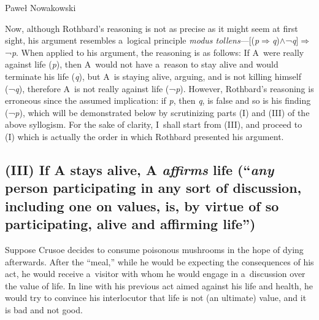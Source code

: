 \begin{artengenv}{Paweł Nowakowski}
\begin{enumerate}[label=(\Roman*), start=4]
\end{enumerate}

Now, although Rothbard's reasoning is not as precise as it might seem at first sight, his argument resembles a~logical principle \textit{modus tollens}---[(\textit{p}$\Rightarrow $\textit{q})${\wedge}$¬\textit{q}]$\Rightarrow $¬\textit{p}. When applied to his argument, the reasoning is as follows: If A~were really against life (\textit{p}), then A~would not have a~reason to stay alive and would terminate his life (\textit{q}), but A~is staying alive, arguing, and is not killing himself (¬\textit{q}), therefore A~is not really against life (¬\textit{p}). However, Rothbard's reasoning is erroneous since the assumed implication: if \textit{p}, then \textit{q}, is false and so is his finding (¬\textit{p}), which will be demonstrated below by scrutinizing parts (I) and (III) of the above syllogism. For the sake of clarity, I~shall start from (III), and proceed to (I) which is actually the order in which Rothbard presented his argument.



%
%
%

\subsection{\textbf{(III) If A stays alive, A \textit{affirms} life} (``\textit{any} person participating in any sort of discussion, including one on values, is, by virtue of so participating, alive and affirming life'')}



Suppose Crusoe decides to consume poisonous mushrooms in the hope of dying afterwards. After the ``meal,'' while he would be expecting the consequences of his act, he would receive a~visitor with whom he would engage in a~discussion over the value of life. In line with his previous act aimed against his life and health, he would try to convince his interlocutor that life is not (an ultimate) value, and it is bad and not good.




\end{artengenv}
